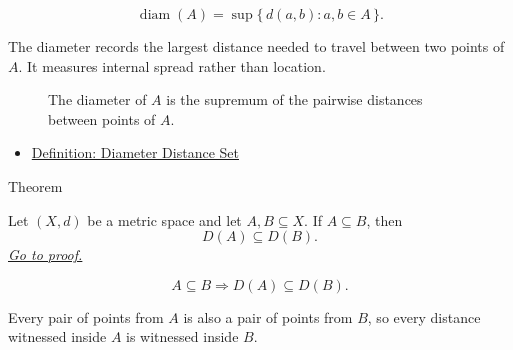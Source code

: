 \begin{remark*}
\[
\operatorname{diam}(A)
=
\sup\{\,d(a,b):a,b\in A\,\}.
\]
\end{remark*}

\begin{remark*}[Interpretation]
The diameter records the largest distance needed to travel between two points
of \(A\).  It measures internal spread rather than location.
\end{remark*}

\begin{figure}[htbp]
\centering

\caption{The diameter of \(A\) is the supremum of the pairwise distances
between points of \(A\).}
\label{fig:metric-diameter-distance-set}
\end{figure}


\begin{dependencies}
\begin{itemize}
  \item \hyperref[def:metric-diameter-distance-set]{Definition: Diameter Distance Set}
\end{itemize}
\end{dependencies}

\begin{theorembox}{Theorem}
\begin{theorem}
\label{thm:metric-diameter-set-monotone}
Let \((X,d)\) be a metric space and let \(A,B\subseteq X\).  If
\(A\subseteq B\), then
\[
  D(A)\subseteq D(B).
\]
\hyperref[prf:metric-diameter-set-monotone]{\textit{Go to proof.}}
\end{theorem}
\end{theorembox}

\begin{remark*}
\[
A\subseteq B
\Longrightarrow
D(A)\subseteq D(B).
\]
\end{remark*}

\begin{remark*}[Interpretation]
Every pair of points from \(A\) is also a pair of points from \(B\), so every
distance witnessed inside \(A\) is witnessed inside \(B\).
\end{remark*}


